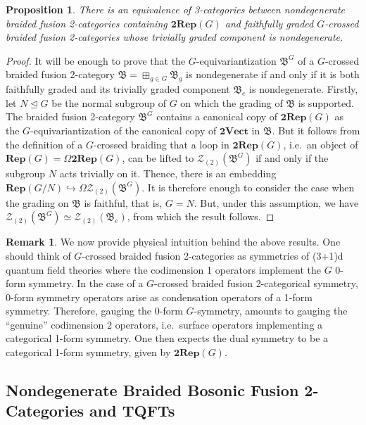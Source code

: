 \documentclass[11pt,reqno]{amsart}
\newcommand{\tRep}{\mathbf{2Rep}}
\numberwithin{equation}{section}
\theoremstyle{plain}
\newtheorem{prop}[equation]{Proposition}
\theoremstyle{definition}
\newtheorem{rem}[equation]{Remark}
\begin{document}
\begin{prop}\label{prop:nondegdeequiv}
There is an equivalence of 3-categories between nondegenerate braided fusion 2-categories containing $\mathbf{2Rep}(G)$ and faithfully graded $G$-crossed braided fusion 2-categories whose trivially graded component is nondegenerate.
\end{prop}
\begin{proof}
It will be enough to prove that the $G$-equivariantization $\mathfrak{B}^G$ of a $G$-crossed braided fusion 2-category $\mathfrak{B} = \boxplus_{g\in G}\mathfrak{B}_g$ is nondegenerate if and only if it is both faithfully graded and its trivially graded component $\mathfrak{B}_e$ is nondegenerate. Firstly, let $N\trianglelefteq G$ be the normal subgroup of $G$ on which the grading of $\mathfrak{B}$ is supported. The braided fusion 2-category $\mathfrak{B}^G$ contains a canonical copy of $\mathbf{2Rep}(G)$ as the $G$-equivariantization of the canonical copy of $\mathbf{2Vect}$ in $\mathfrak{B}$. But it follows from the definition of a $G$-crossed braiding that a loop in $\mathbf{2Rep}(G)$, i.e.\ an object of $\mathbf{Rep}(G)=\Omega\mathbf{2Rep}(G)$, can be lifted to $\mathcal{Z}_{(2)}(\mathfrak{B}^G)$ if and only if the subgroup $N$ acts trivially on it.
Thence, there is an embedding $\mathbf{Rep}(G/N)\hookrightarrow \Omega\mathcal{Z}_{(2)}(\mathfrak{B}^G)$.
It is therefore enough to consider the case when the grading on $\mathfrak{B}$ is faithful, that is, $G=N$. But, under this assumption, we have $\mathcal{Z}_{(2)}(\mathfrak{B}^G)\simeq \mathcal{Z}_{(2)}(\mathfrak{B}_e)$, from which the result follows.
\end{proof}

\begin{rem}
We now provide physical intuition behind the above results. One should think of $G$-crossed braided fusion 2-categories as symmetries of (3+1)d quantum field theories where the codimension 1 operators implement the $G$ 0-form symmetry. In the case of a $G$-crossed braided fusion 2-categorical symmetry, 0-form symmetry operators arise as condensation operators of a 1-form symmetry. Therefore, gauging the 0-form $G$-symmetry, amounts to gauging  the ``genuine'' codimension $2$ operators, i.e.\ surface operators implementing a categorical 1-form symmetry. One then expects the dual symmetry to be a categorical 1-form symmetry, given by $\tRep(G)$.
\end{rem}

\subsection{Nondegenerate Braided Bosonic Fusion 2-Categories and TQFTs}\label{subsection:BBF2C}
\end{document}
